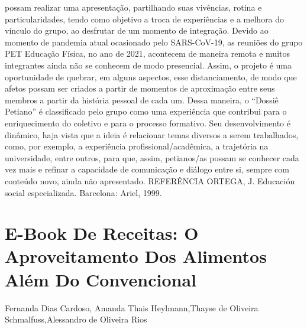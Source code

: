 possam realizar uma apresentação, partilhando suas vivências, rotina e particularidades, tendo 
como objetivo a troca de experiências e a melhora do vínculo do grupo, ao desfrutar de um 
momento de integração. Devido ao momento de pandemia atual ocasionado pelo SARS-CoV-19, 
as reuniões do grupo PET Educação Física, no ano de 2021, acontecem de maneira remota e muitos 
integrantes ainda não se conhecem de modo presencial. Assim, o projeto é uma oportunidade de 
quebrar, em alguns aspectos, esse distanciamento, de modo que afetos possam ser criados a partir 
de momentos de aproximação entre seus membros a partir da história pessoal de cada um.
Dessa maneira, o “Dossiê Petiano” é classificado pelo grupo como uma experiência que 
contribui para o enriquecimento do coletivo e para o processo formativo. Seu desenvolvimento é 
dinâmico, haja vista que a ideia é relacionar temas diversos a serem trabalhados, como, por 
exemplo, a experiência profissional/acadêmica, a trajetória na universidade, entre outros, para que, 
assim, petianos/as possam se conhecer cada vez mais e refinar a capacidade de comunicação e 
diálogo entre si, sempre com conteúdo novo, ainda não apresentado.
REFERÊNCIA
ORTEGA, J. Educación social especializada. Barcelona: Ariel, 1999.




\section*{E-Book De Receitas: O Aproveitamento Dos Alimentos Além Do Convencional}

Fernanda Dias Cardoso, Amanda Thais Heylmann,Thayse de Oliveira Schmalfuss,Alessandro de Oliveira Rios

